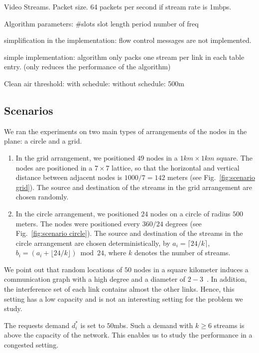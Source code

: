 \documentclass[12pt]{article}
\newenvironment{proof sketch}[1]{\noindent {\emph{Proof sketch of #1:}}}{\hfill \qed}
\begin{document}
Video Streams. Packet size.
64 packets per second if stream rate is 1mbps.

Algorithm parameters:
\#slots
slot length
period
number of freq

simplification in the implementation:
flow control messages are not implemented.

simple implementation:
algorithm only packs one stream per link in each table entry.
(only reduces the performance of the algorithm)

Clean air threshold:
with schedule:
without schedule: 500m

\subsection{Scenarios}
We ran the experiments on two main types of arrangements of the nodes
in the plane: a circle and a grid.

\begin{enumerate}
\item In the grid arrangement, we positioned $49$ nodes in a
  $1km\times 1km$ square. The nodes are positioned in a $7\times 7$
  lattice, so that the horizontal and vertical distance between
  adjacent nodes is $1000/7=142$ meters (see Fig.~\ref{fig:scenario
    grid}).    The source and destination of the streams
  in the grid arrangement are chosen randomly.

\item In the circle arrangement, we positioned $24$ nodes on a circle
  of radius $500$ meters.  The nodes were positioned every $360/24$
  degrees (see Fig.~\ref{fig:scenario circle}). The source and
  destination of the streams in the circle arrangement are chosen
  deterministically, by $a_i=\lceil 24/k \rceil$, $b_i=(a_i + \lfloor
  24/k \rfloor) \bmod 24$, where $k$ denotes the number of streams.
\end{enumerate}

We point out that random locations of $50$ nodes in a square kilometer
induces a communication graph with a high degree and a diameter of
$2-3$~\cite{marina2010topology}. In addition, the interference set of
each link contains almost the other links. Hence, this setting has a
low capacity and is not an interesting setting for the problem we
study.

The requests demand $d^*_i$ is set to $50$mbs. Such a demand with
$k\geq 6$ streams is above the capacity of the network. This enables
us to study the performance in a congested setting.
\end{document}
